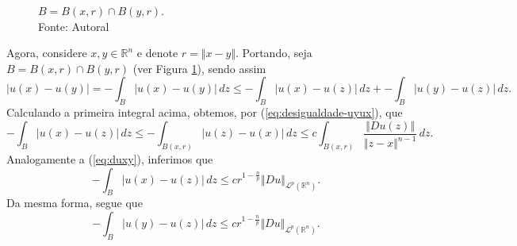 \documentclass[a4paper, 11pt]{book}
\theoremstyle{definition}
\newcommand{\bR}{\mathbb{R}}
\newcommand{\cL}{\mathcal{L}}
\newcommand{\sint}{-\!\!\!\!\!\!\int}
\begin{document}
\begin{prf}
    \begin{figure}
        \centering
        \caption{$B = B(x,r) \cap B(y,r)$.\\
        Fonte: Autoral}
        \label{fig:B}
    \end{figure}
    Agora, considere $x, y \in \bR^n$ e denote $r = \Vert x - y \Vert$. Portando, seja $B = B(x,r) \cap B(y,r)$ (ver Figura \ref{fig:B}), sendo assim
    \begin{equation} \label{eq:abcd}
        |u(x) - u(y)| = \sint_{B} |u(x) - u(y)| \,dz \leqslant \sint_{B} |u(x) - u(z)| \,dz + \sint_B |u(y) - u(z)| \,dz.
    \end{equation}
    Calculando a primeira integral acima, obtemos, por (\ref{eq:desigualdade-uyux}), que
    \[
        \sint_B |u(x) - u(z)| \,dz \leqslant \sint_{B(x,r)} |u(z) - u(x)| \,dz \leqslant c \int_{B(x,r)} \frac{\Vert Du(z) \Vert}{\Vert z - x \Vert^{n-1}} \,dz.
    \]
    Analogamente a (\ref{eq:duxy}), inferimos que
    \[
        \sint_B |u(x) - u(z)| \,dz \leqslant cr^{1 - \frac{n}{p}} \Vert Du \Vert_{\cL^p(\bR^n)}.
    \]
    Da mesma forma, segue que
    \[
        \sint_B |u(y) - u(z)| \,dz \leqslant cr^{1 - \frac{n}{p}} \Vert Du \Vert_{\cL^p(\bR^n)}.
    \]


\end{prf}
\end{document}
